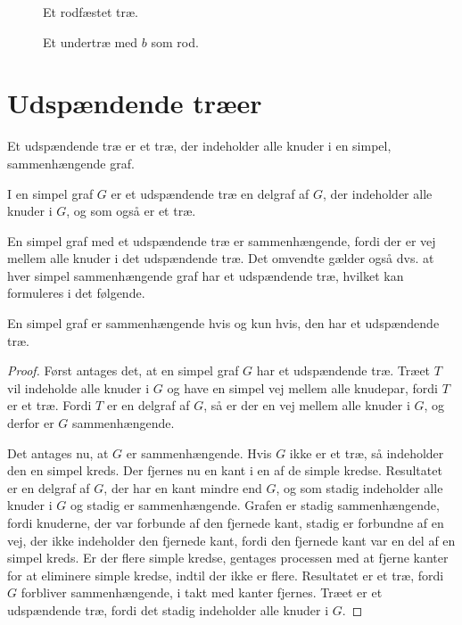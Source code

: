 \begin{figure}[h]
\centering

\caption{Et rodfæstet træ.} 
\label{eksempel_rootedtree}
\end{figure}

\begin{figure}[h]
\centering

\caption{Et undertræ med $b$ som rod.} 
\label{eksempel_rootedsubtree}
\end{figure}

\section{Udspændende træer}

Et udspændende træ er et træ, der indeholder alle knuder i en simpel, sammenhængende graf.

\begin{defn}
I en simpel graf $G$ er et udspændende træ en delgraf af $G$, der indeholder alle knuder i $G$, og som også er et træ.
\end{defn}

En simpel graf med et udspændende træ er sammenhængende, fordi der er vej mellem alle knuder i det udspændende træ.
Det omvendte gælder også dvs. at hver simpel sammenhængende graf har et udspændende træ, hvilket kan formuleres i det følgende.

\begin{thm}
En simpel graf er sammenhængende hvis og kun hvis, den har et udspændende træ.
\end{thm}

\begin{proof}
Først antages det, at en simpel graf $G$ har et udspændende træ. 
Træet $T$ vil indeholde alle knuder i $G$ og have en simpel vej mellem alle knudepar, fordi $T$ er et træ. 
Fordi $T$ er en delgraf af $G$, så er der en vej mellem alle knuder i $G$, og derfor er $G$ sammenhængende.

Det antages nu, at $G$ er sammenhængende. Hvis $G$ ikke er et træ, så indeholder den en simpel kreds. 
Der fjernes nu en kant i en af de simple kredse. 
Resultatet er en delgraf af $G$, der har en kant mindre end $G$, og som stadig indeholder alle knuder i $G$ og stadig er sammenhængende. 
Grafen er stadig sammenhængende, fordi knuderne, der var forbunde af den fjernede kant, stadig er forbundne af en vej, der ikke indeholder den fjernede kant, fordi den fjernede kant var en del af en simpel kreds. 
Er der flere simple kredse, gentages processen med at fjerne kanter for at eliminere simple kredse, indtil der ikke er flere. 
Resultatet er et træ, fordi $G$ forbliver sammenhængende, i takt med kanter fjernes. Træet er et udspændende træ, fordi det stadig indeholder alle knuder i $G$.
\end{proof}

